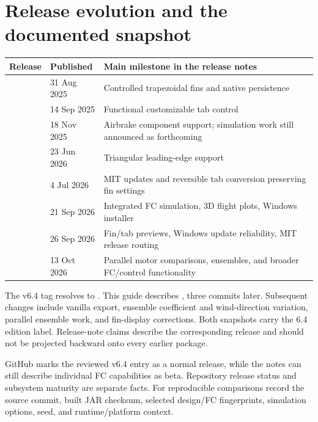 \section{Release evolution and the documented snapshot}
\begin{tabularx}{\linewidth}{@{}L{2.8cm}L{2.7cm}Y@{}}\toprule
Release & Published & Main milestone in the release notes\\\midrule
{} & 31 Aug 2025 & Controlled trapezoidal fins and native persistence\\
 & 14 Sep 2025 & Functional customizable tab control\\
 & 18 Nov 2025 & Airbrake component support; simulation work still announced as forthcoming\\
 & 23 Jun 2026 & Triangular leading-edge support\\
 & 4 Jul 2026 & MIT updates and reversible tab conversion preserving fin settings\\
 & 21 Sep 2026 & Integrated FC simulation, 3D flight plots, Windows installer\\
 & 26 Sep 2026 & Fin/tab previews, Windows update reliability, MIT release routing\\
 & 13 Oct 2026 & Parallel motor comparisons, ensembles, and broader FC/control functionality\\\bottomrule
\end{tabularx}

The v6.4 tag resolves to . This guide describes , three commits later. Subsequent changes include vanilla export, ensemble coefficient and wind-direction variation, parallel ensemble work, and fin-display corrections. Both snapshots carry the 6.4 edition label. Release-note claims describe the corresponding release and should not be projected backward onto every earlier package.

GitHub marks the reviewed v6.4 entry as a normal release, while the notes can still describe individual FC capabilities as beta. Repository release status and subsystem maturity are separate facts. For reproducible comparisons record the source commit, built JAR checksum, selected design/FC fingerprints, simulation options, seed, and runtime/platform context.



